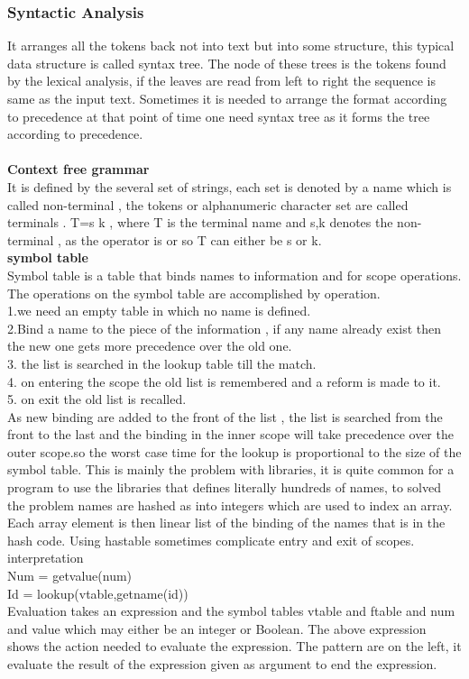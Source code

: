 \documentclass[23pt]{article}
\begin{document}
\subsubsection{Syntactic Analysis}
{\Large It arranges all the tokens back not into text but into some structure, this typical data structure is called syntax tree. The node of these trees is the tokens found by the lexical analysis, if the leaves are read from left to right the sequence is same as the input text. Sometimes it is needed to arrange the format according to precedence at that point of time one need syntax tree as it forms the tree according to precedence. \\ \\ \textbf{Context free grammar }\\

It is defined by the several set of strings, each set is denoted by a name which is called non-terminal , the tokens or alphanumeric character set are called terminals .
T=s \textbar k , where T is the terminal name and { s,k } denotes the non-terminal , as the operator is or so T can either be s or k.
\\ \textbf{ symbol table} \\
Symbol table is a table that binds names to information and for scope operations. The operations on the symbol table are accomplished by operation. \\
\hspace{5cm} 1.we need an empty table in which no name is defined. \\
2.Bind a name to the piece of the information , if any name already exist then the new one gets more precedence over the old one. \\
3. the list is searched in the lookup table till the match. \\
4. on entering the  scope the old list is remembered and a reform is made to it. \\
5. on exit the old list is recalled. \\
As new binding are added to the front of the list , the list is searched from the front to the last and the binding in the inner scope will take precedence over the outer scope.so the worst case time for the lookup is proportional to the size of the symbol table. This is mainly the problem with libraries, it is quite common for a program to use the libraries that defines literally hundreds of names, to solved the problem names are hashed as into integers which are used to index an array. Each array element is then linear list of the binding of the names that is in the hash code. Using hastable sometimes complicate entry and exit of scopes. \\ interpretation  \\
Num = getvalue(num)  \\
Id = lookup(vtable,getname(id)) \\
Evaluation takes an expression and the symbol tables vtable and ftable and num and value which may either be an integer or Boolean. The above expression shows the action needed to evaluate the expression. The pattern are on the left, it evaluate the result of the expression given as argument to end the expression.
\par}
\end{document}
